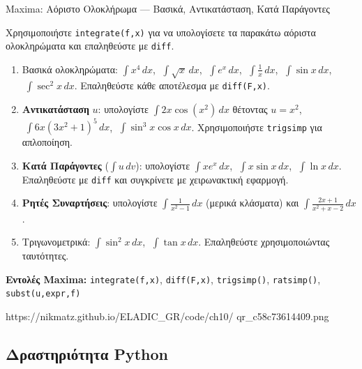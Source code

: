 %

\casactivbox%
  {Maxima: Αόριστο Ολοκλήρωμα — Βασικά, Αντικατάσταση, Κατά Παράγοντες}%
  {%
    \label{cas:ch10_integral}
    Χρησιμοποιήστε \texttt{integrate(f,x)} για να υπολογίσετε τα
    παρακάτω αόριστα ολοκληρώματα και επαληθεύστε με \texttt{diff}.
    \begin{enumerate}[label=(\alph*),itemsep=2pt]
      \item Βασικά ολοκληρώματα:
        $\int x^4\,dx$, $\;\int\sqrt{x}\,dx$, $\;\int e^x\,dx$,
        $\;\int\frac{1}{x}\,dx$, $\;\int\sin x\,dx$,
        $\;\int\sec^2 x\,dx$.
        Επαληθεύστε κάθε αποτέλεσμα με \texttt{diff(F,x)}.
      \item \textbf{Αντικατάσταση} $u$: υπολογίστε
        $\int 2x\cos(x^2)\,dx$ θέτοντας $u=x^2$,
        $\;\int 6x(3x^2+1)^5\,dx$,
        $\;\int\sin^3 x\cos x\,dx$.
        Χρησιμοποιήστε \texttt{trigsimp} για απλοποίηση.
      \item \textbf{Κατά Παράγοντες} ($\int u\,dv$): υπολογίστε
        $\int xe^x\,dx$, $\;\int x\sin x\,dx$, $\;\int\ln x\,dx$.
        Επαληθεύστε με \texttt{diff} και συγκρίνετε με χειρωνακτική εφαρμογή.
      \item \textbf{Ρητές Συναρτήσεις}: υπολογίστε
        $\int\frac{1}{x^2-1}\,dx$ (μερικά κλάσματα) και
        $\int\frac{2x+1}{x^2+x-2}\,dx$.
      \item Τριγωνομετρικά: $\int\sin^2 x\,dx$, $\;\int\tan x\,dx$.
        Επαληθεύστε χρησιμοποιώντας ταυτότητες.
    \end{enumerate}
    \smallskip
    \textbf{Εντολές Maxima:}
    \texttt{integrate(f,x)}, \texttt{diff(F,x)},
    \texttt{trigsimp()}, \texttt{ratsimp()},
    \texttt{subst(u,expr,f)}
  }%
  {https://nikmatz.github.io/ELADIC_GR/code/ch10/}%
  {qr_c58c73614409.png}

\subsection*{Δραστηριότητα Python}

